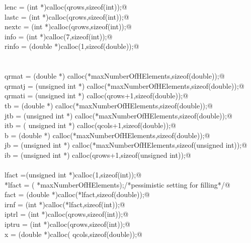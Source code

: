 \documentclass[12pt]{article}
\begin{document}
\begin{flushleft}
\begin{minipage}{\linewidth}
\begin{list}{}{}
\mbox{}\verb@        lenc = (int *)calloc(qrows,sizeof(int));@\\
\mbox{}\verb@        lastc = (int *)calloc(qrows,sizeof(int));@\\
\mbox{}\verb@        nextc = (int *)calloc(qrows,sizeof(int));@\\
\mbox{}\verb@        info = (int *)calloc(7,sizeof(int));@\\
\mbox{}\verb@        rinfo = (double *)calloc(1,sizeof(double));@\\
\mbox{}\verb@@\\
\mbox{}\verb@@\\
\mbox{}\verb@        qrmat = (double *) calloc(*maxNumberOfHElements,sizeof(double));@\\
\mbox{}\verb@        qrmatj = (unsigned int *) calloc(*maxNumberOfHElements,sizeof(double));@\\
\mbox{}\verb@        qrmati = (unsigned int *) calloc(qrows+1,sizeof(double));@\\
\mbox{}\verb@        tb = (double *) calloc(*maxNumberOfHElements,sizeof(double));@\\
\mbox{}\verb@        jtb = (unsigned int *) calloc(*maxNumberOfHElements,sizeof(double));@\\
\mbox{}\verb@        itb = ( unsigned int *) calloc(qcols+1,sizeof(double));@\\
\mbox{}\verb@        b = (double *) calloc(*maxNumberOfHElements,sizeof(double));@\\
\mbox{}\verb@        jb = (unsigned int *) calloc(*maxNumberOfHElements,sizeof(unsigned int));@\\
\mbox{}\verb@        ib = (unsigned int *) calloc(qrows+1,sizeof(unsigned int));@\\
\mbox{}\verb@@\\
\mbox{}\verb@        lfact =(unsigned int *)calloc(1,sizeof(int));@\\
\mbox{}\verb@        *lfact = (  *maxNumberOfHElements);/*pessimistic setting for filling*/@\\
\mbox{}\verb@        fact = (double *)calloc(*lfact,sizeof(double));@\\
\mbox{}\verb@        irnf = (int *)calloc(*lfact,sizeof(int));@\\
\mbox{}\verb@        iptrl = (int *)calloc(qrows,sizeof(int));@\\
\mbox{}\verb@        iptru = (int *)calloc(qrows,sizeof(int));@\\
\mbox{}\verb@        x = (double *)calloc(  qcols,sizeof(double));@\\

\end{list}
\end{minipage}
\end{flushleft}
\end{document}
